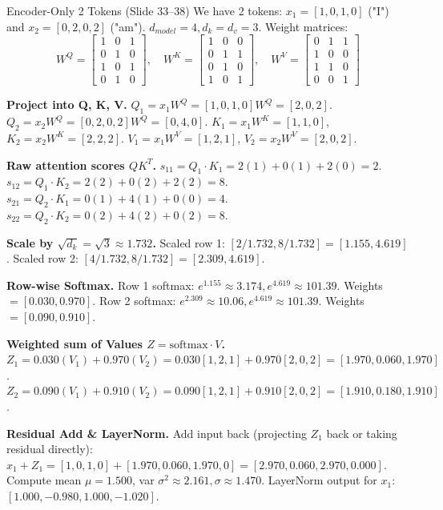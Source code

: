 \documentclass[a4paper,11pt]{article}
\begin{document}
\begin{worked}{Encoder-Only 2 Tokens (Slide 33--38)}
We have 2 tokens: $x_1 = [1, 0, 1, 0]$ ("I") and $x_2 = [0, 2, 0, 2]$ ("am"). $d_{model} = 4, d_k = d_v = 3$.
Weight matrices:
$$ W^Q = \begin{bmatrix} 1 & 0 & 1 \\ 0 & 1 & 0 \\ 1 & 0 & 1 \\ 0 & 1 & 0 \end{bmatrix}, \quad
W^K = \begin{bmatrix} 1 & 0 & 0 \\ 0 & 1 & 1 \\ 0 & 1 & 0 \\ 1 & 0 & 1 \end{bmatrix}, \quad
W^V = \begin{bmatrix} 0 & 1 & 1 \\ 1 & 0 & 0 \\ 1 & 1 & 0 \\ 0 & 0 & 1 \end{bmatrix} $$

\begin{steps}
  \item \textbf{Project into Q, K, V.}
        $Q_1 = x_1 W^Q = [1,0,1,0] W^Q = [2, 0, 2]$.
        $Q_2 = x_2 W^Q = [0,2,0,2] W^Q = [0, 4, 0]$.
        $K_1 = x_1 W^K = [1, 1, 0]$, $K_2 = x_2 W^K = [2, 2, 2]$.
        $V_1 = x_1 W^V = [1, 2, 1]$, $V_2 = x_2 W^V = [2, 0, 2]$.
  \item \textbf{Raw attention scores $Q K^T$.}
        $s_{11} = Q_1 \cdot K_1 = 2(1) + 0(1) + 2(0) = 2$.
        $s_{12} = Q_1 \cdot K_2 = 2(2) + 0(2) + 2(2) = 8$.
        $s_{21} = Q_2 \cdot K_1 = 0(1) + 4(1) + 0(0) = 4$.
        $s_{22} = Q_2 \cdot K_2 = 0(2) + 4(2) + 0(2) = 8$.
  \item \textbf{Scale by $\sqrt{d_k} = \sqrt{3} \approx 1.732$.}
        Scaled row 1: $[2/1.732, 8/1.732] = [1.155, 4.619]$.
        Scaled row 2: $[4/1.732, 8/1.732] = [2.309, 4.619]$.
  \item \textbf{Row-wise Softmax.}
        Row 1 softmax: $e^{1.155} \approx 3.174, e^{4.619} \approx 101.39$. Weights $= [0.030, 0.970]$.
        Row 2 softmax: $e^{2.309} \approx 10.06, e^{4.619} \approx 101.39$. Weights $= [0.090, 0.910]$.
  \item \textbf{Weighted sum of Values $Z = \text{softmax} \cdot V$.}
        $Z_1 = 0.030(V_1) + 0.970(V_2) = 0.030[1, 2, 1] + 0.970[2, 0, 2] = [1.970, 0.060, 1.970]$.
        $Z_2 = 0.090(V_1) + 0.910(V_2) = 0.090[1, 2, 1] + 0.910[2, 0, 2] = [1.910, 0.180, 1.910]$.
  \item \textbf{Residual Add \& LayerNorm.}
        Add input back (projecting $Z_1$ back or taking residual directly): $x_1 + Z_1 = [1, 0, 1, 0] + [1.970, 0.060, 1.970, 0] = [2.970, 0.060, 2.970, 0.000]$.
        Compute mean $\mu = 1.500$, var $\sigma^2 \approx 2.161, \sigma \approx 1.470$.
        LayerNorm output for $x_1$: $[1.000, -0.980, 1.000, -1.020]$.
\end{steps}
\end{worked}
\end{document}
